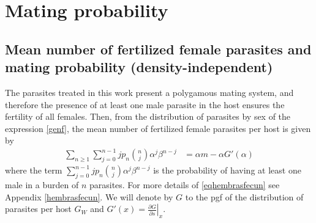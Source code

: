 \documentclass[12pt,a4paper]{article}
\theoremstyle{plain}%
\theoremstyle{definition}
\theoremstyle{remark}
\begin{document}
	
	
	\section{Mating probability}\label{sec:probapareamiento}
	\subsection{Mean number of fertilized female parasites and mating probability (density-independent)}

	The parasites treated in this work present a polygamous mating system, and therefore the presence of at least one male parasite in the host ensures the fertility of all females.
	Then, from the distribution of parasites by sex 
	of the expression 
	\eqref{genf}, the mean number of fertilized female parasites per host is given by
	\begin{equation}\label{eqhembrasfecun}
	\begin{split}
	\sum_{n\geq 1}\sum_{j=0}^{n-1}j p_n\binom{n}{j}\alpha^j\beta^{n-j}
	&=\alpha  m - \alpha G'(\alpha)
	\end{split}
	\end{equation}
	where the term $\sum_{j=0}^{n-1}j p_n\binom{n}{j}\alpha^j\beta^{n-j}$ 
	is the probability of having at least one male in a burden of $n$ parasites. 
	For more details of \eqref{eqhembrasfecun} see Appendix \eqref{hembrasfecun}. 
	We will denote by $G$ to the pgf of the distribution of parasites per host $G_W$
	and  $G'(x)=\left.\frac{\partial G}{\partial s}\right|_{x}$.
	
\end{document}

